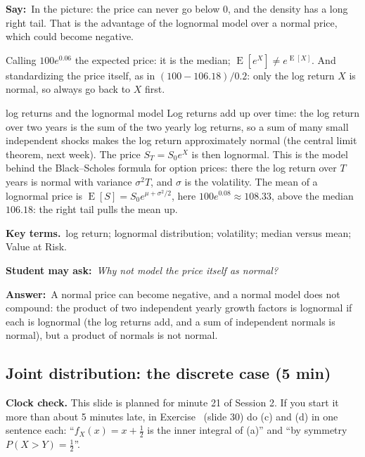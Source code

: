 \documentclass[11pt,a4paper,parskip=half]{scrartcl}
\renewcommand{\needspace}[1]{\Needspace{6\baselineskip}}
\newcommand{\E}{\operatorname{E}}
\newcommand{\terms}{\par\textbf{\color{plum}Key terms.}\ }
\newcommand{\sq}[1]{\par\textbf{\color{plum}Student may ask:}\ \emph{#1}\par}
\newcommand{\ans}{\textbf{Answer:}\ }
\newcommand{\say}{\textbf{\color{teal}Say:}\ }
\begin{document}
\say In the picture: the price can never go below 0, and the density has a
long right tail. That is the advantage of the lognormal model over a
normal price, which could become negative.

\begin{mistake}
	Calling $100e^{0.06}$ the expected price: it is the median;
	$\E[e^X]\ne e^{\E[X]}$. And standardizing the price itself, as in
	$(100-106.18)/0.2$: only the log return $X$ is normal, so always go back
	to $X$ first.
\end{mistake}

\begin{bg}{log returns and the lognormal model}
	Log returns add up over time: the log return over two years is the sum
	of the two yearly log returns, so a sum of many small independent
	shocks makes the log return approximately normal (the central limit
	theorem, next week). The price $S_T=S_0e^{X}$ is then lognormal. This is
	the model behind the Black--Scholes formula for option prices: there the
	log return over $T$ years is normal with variance $\sigma^2T$, and
	$\sigma$ is the volatility. The mean of a lognormal price is
	$\E[S]=S_0e^{\mu+\sigma^2/2}$, here $100e^{0.08}\approx108.33$, above the
	median $106.18$: the right tail pulls the mean up.

	\terms log return; lognormal distribution; volatility; median versus
	mean; Value at Risk.

	\sq{Why not model the price itself as normal?}
	\ans A normal price can become negative, and a normal model does not
	compound: the product of two independent yearly growth factors is
	lognormal if each is lognormal (the log returns add, and a sum of
	independent normals is normal), but a product of normals is not normal.
\end{bg}

\needspace{0.4\textheight}
\subsection{Joint distribution: the discrete case (5 min)}

\begin{clockcheck}
	\textbf{Clock check.} This slide is planned for minute 21 of Session 2.
	If you start it more than about 5 minutes late, in
	Exercise~ (slide 30) do (c) and (d) in one
	sentence each: ``$f_X(x)=x+\frac12$ is the inner integral of (a)'' and
	``by symmetry $P(X>Y)=\frac12$''.
\end{clockcheck}
\end{document}
